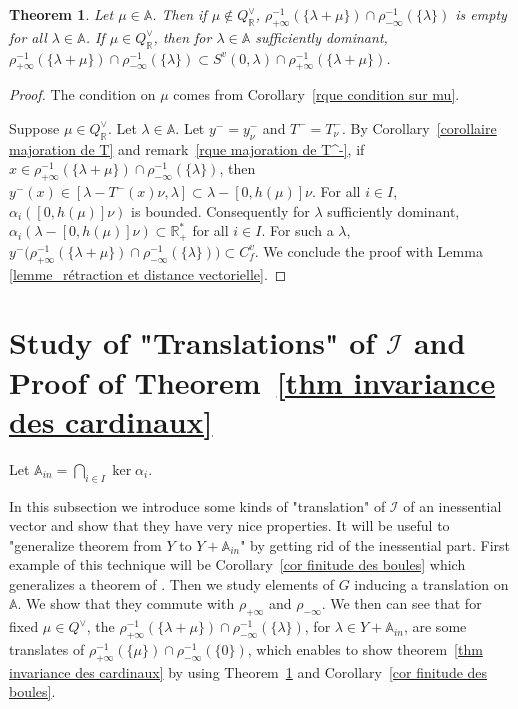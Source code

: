 \documentclass[12pt]{article}
\theoremstyle{plain}
\newtheorem{theorem}{Theorem}[section] %
\theoremstyle{definition}
\newcommand{\R}{\mathbb{R}}
\newcommand{\A}{\mathbb{A}}
\newcommand{\I}{\mathcal{I}}
\begin{document}
\begin{theorem}\label{thm inclusion}
Let $\mu\in \A$. Then if $\mu\notin Q_{\R}^\vee$, $\rho_{+\infty}^{-1}(\{\lambda+\mu\})\cap \rho_{-\infty}^{-1}(\{\lambda\})$ is empty for all $\lambda\in \A$. If $\mu\in Q^\vee_{\R}$, then for $\lambda\in \A$ sufficiently dominant, $\rho_{+\infty}^{-1}(\{\lambda+\mu\})\cap \rho_{-\infty}^{-1}(\{\lambda\})\subset S^v(0,\lambda)\cap \rho_{+\infty}^{-1}(\{\lambda+\mu\}) $. 
\end{theorem}

\begin{proof} The condition on $\mu$ comes from Corollary~\ref{rque condition sur mu}. 

Suppose $\mu\in Q^\vee_\R$.
Let $\lambda\in \A$. Let $y^-=y^-_\nu$ and $T^-=T_\nu^-$. By Corollary~\ref{corollaire majoration de T} and remark~\ref{rque majoration de T^-}, if $x\in \rho_{+\infty}^{-1}(\{\lambda+\mu\})\cap \rho_{-\infty}^{-1}(\{\lambda\})$, then $y^-(x)\in [\lambda-T^-(x)\nu, \lambda]\subset \lambda-[0,h(\mu)]\nu$. 
For all $i\in I$, $\alpha_i([0,h(\mu)]\nu)$ is bounded. Consequently for $\lambda$ sufficiently dominant, $\alpha_i(\lambda-[0,h(\mu)]\nu)\subset \mathbb{R}^*_+$ for all $i\in I$.  For such a $\lambda$,  $y^-\big(\rho_{+\infty}^{-1}(\{\lambda+\mu\})\cap \rho_{-\infty}^{-1}(\{\lambda\})\big)\subset C^v_f$. We conclude the proof with Lemma \ref{lemme_rétraction et distance vectorielle}.
  
\end{proof}

\section{Study of "Translations" of $\I$ and Proof of Theorem~\ref{thm invariance des cardinaux}}\label{sect translations}



Let $\A_{in}=\bigcap_{i\in I} \ker \alpha_i$.

In this subsection we introduce some kinds of "translation" of $\I$ of an inessential vector and show that they have very nice properties. It will be useful to "generalize theorem from $Y$ to $Y+\A_{in}$" by getting rid of the inessential part. First example of this technique will be Corollary~\ref{cor finitude des boules} which generalizes a theorem of \cite{gaussent2014spherical}. Then we study elements of $G$ inducing a translation on $\A$. We show that they commute with $\rho_{+\infty}$ and $\rho_{-\infty}$. We then can see that for fixed $\mu\in Q^\vee$, the $\rho_{+\infty}^{-1}(\{\lambda+\mu\})\cap\rho_{-\infty}^{-1}(\{\lambda\})$, for $\lambda\in Y+\A_{in}$, are some translates of  $\rho_{+\infty}^{-1}(\{\mu\})\cap\rho_{-\infty}^{-1}(\{0\})$, which enables to show theorem~\ref{thm invariance des cardinaux} by using Theorem~\ref{thm inclusion} and Corollary~\ref{cor finitude des boules}.
\end{document}

